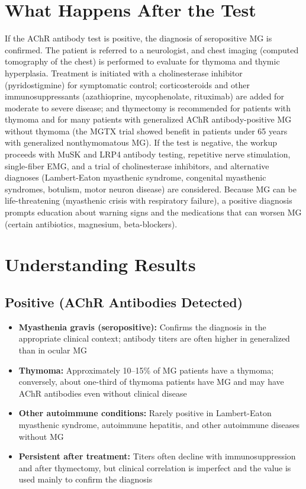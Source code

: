 \section*{What Happens After the Test}
If the AChR antibody test is positive, the diagnosis of seropositive MG is confirmed. The patient is referred to a neurologist, and chest imaging (computed tomography of the chest) is performed to evaluate for thymoma and thymic hyperplasia. Treatment is initiated with a cholinesterase inhibitor (pyridostigmine) for symptomatic control; corticosteroids and other immunosuppressants (azathioprine, mycophenolate, rituximab) are added for moderate to severe disease; and thymectomy is recommended for patients with thymoma and for many patients with generalized AChR antibody-positive MG without thymoma (the MGTX trial showed benefit in patients under 65 years with generalized nonthymomatous MG). If the test is negative, the workup proceeds with MuSK and LRP4 antibody testing, repetitive nerve stimulation, single-fiber EMG, and a trial of cholinesterase inhibitors, and alternative diagnoses (Lambert-Eaton myasthenic syndrome, congenital myasthenic syndromes, botulism, motor neuron disease) are considered. Because MG can be life-threatening (myasthenic crisis with respiratory failure), a positive diagnosis prompts education about warning signs and the medications that can worsen MG (certain antibiotics, magnesium, beta-blockers).

\section*{Understanding Results}

\subsection*{Positive (AChR Antibodies Detected)}
\begin{itemize}
  \item \textbf{Myasthenia gravis (seropositive):} Confirms the diagnosis in the appropriate clinical context; antibody titers are often higher in generalized than in ocular MG
  \item \textbf{Thymoma:} Approximately 10--15\% of MG patients have a thymoma; conversely, about one-third of thymoma patients have MG and may have AChR antibodies even without clinical disease
  \item \textbf{Other autoimmune conditions:} Rarely positive in Lambert-Eaton myasthenic syndrome, autoimmune hepatitis, and other autoimmune diseases without MG
  \item \textbf{Persistent after treatment:} Titers often decline with immunosuppression and after thymectomy, but clinical correlation is imperfect and the value is used mainly to confirm the diagnosis
\end{itemize}

